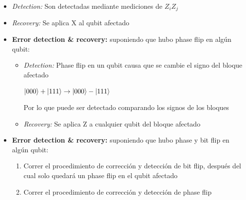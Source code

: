 \documentclass[10pt]{beamer}
\theoremstyle{remark}
\theoremstyle{definition}
\begin{document}
\begin{frame}[allowframebreaks]
\begin{itemize}
        \begin{itemize}
            \item \textit{Detection:} Son detectadas mediante mediciones de $Z_iZ_j$
            \item \textit{Recovery:} Se aplica X al qubit afectado
        \end{itemize}
    \end{itemize}

    \framebreak

    \begin{itemize}
        \item \textbf{Error detection \& recovery:} suponiendo que hubo phase flip en algún qubit:
    
        \vspace{0.4cm}

        \begin{itemize}
            \item \textit{Detection:} Phase flip en un qubit causa que se cambie el signo del bloque afectado
            
            $\ket{000} + \ket{111} \rightarrow \ket{000} - \ket{111}$

            Por lo que puede ser detectado comparando los signos de los bloques

            \item \textit{Recovery:} Se aplica Z a cualquier qubit del bloque afectado
        \end{itemize}
    \end{itemize}

    \framebreak

    \begin{itemize}
        \item \textbf{Error detection \& recovery:} suponiendo que hubo phase y bit flip en algún qubit:
    
        \vspace{0.4cm}

        \begin{enumerate}
            \item Correr el procedimiento de corrección y detección de bit flip, después del cual solo quedará un phase flip en el qubit afectado
            \item Correr el procedimiento de corrección y detección de phase flip
        \end{enumerate}
    \end{itemize}

    \framebreak


\end{frame}
\end{document}
